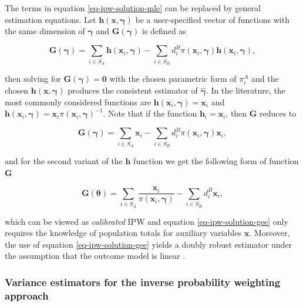 \documentclass[
]{jss}
\begin{document}
The terms in equation \eqref{eq-ipw-solution-mle} can be replaced by
general estimation equations. Let
\(\boldsymbol{h}(\boldsymbol{x}, \boldsymbol{\gamma})\) be a
user-specified vector of functions with the same dimension of
\(\boldsymbol{\gamma}\) and \(\boldsymbol{G}(\boldsymbol{\gamma})\) is
defined as

\begin{equation}
\label{gee}
\boldsymbol{G}(\boldsymbol{\gamma})=\sum_{i \in S_A} \boldsymbol{h}\left(\boldsymbol{x}_i, \boldsymbol{\gamma}\right)-\sum_{i \in S_B} d_i^B \pi\left(\boldsymbol{x}_i, \boldsymbol{\gamma}\right) \boldsymbol{h}\left(\boldsymbol{x}_i, \boldsymbol{\gamma}\right),
\end{equation}

then solving for \(\boldsymbol{G}(\boldsymbol{\gamma})=\boldsymbol{0}\)
with the chosen parametric form of \(\pi_i^A\) and the chosen
\(\boldsymbol{h}(\boldsymbol{x},\boldsymbol{\gamma})\) produces the
consistent estimator of \(\hat{\boldsymbol{\gamma}}\). In the
literature, the most commonly considered functions are
\(\boldsymbol{h}\left(\boldsymbol{x}_i, \boldsymbol{\gamma}\right) = \boldsymbol{x}_i\)
and
\(\boldsymbol{h}\left(\boldsymbol{x}_i, \boldsymbol{\gamma}\right) = \boldsymbol{x}_i \pi\left(\boldsymbol{x}_i, \boldsymbol{\gamma}\right)^{-1}\).
Note that if the function \(\boldsymbol{h}_i=\boldsymbol{x}_i\), then
\(\boldsymbol{G}\) reduces to

\[
\boldsymbol{G}(\boldsymbol{\gamma}) = \sum_{i \in S_A} \boldsymbol{x}_i-\sum_{i \in S_B} d_i^B \pi\left(\boldsymbol{x}_i, \boldsymbol{\gamma}\right) \boldsymbol{x}_i,
\]

and for the second variant of the \(\boldsymbol{h}\) function we get the
following form of function \(\boldsymbol{G}\)

\begin{equation}
\boldsymbol{G}(\boldsymbol{\theta}) = \sum_{i \in S_A} \frac{\boldsymbol{x}_i}{\pi\left(\boldsymbol{x}_i, \boldsymbol{\gamma}\right) }-\sum_{i \in S_B} d_i^B \boldsymbol{x}_i,
\label{eq-ipw-solution-gee}
\end{equation}

which can be viewed as \textit{calibrated} IPW and equation
\eqref{eq-ipw-solution-gee} only requires the knowledge of population
totals for auxiliary variables \(\boldsymbol{x}\). Moreover, the use of
equation \eqref{eq-ipw-solution-gee} yields a doubly robust estimator
under the assumption that the outcome model is linear
\citep{kim_theory_2012}.

\subsubsection{Variance estimators for the inverse probability weighting
approach}\label{variance-estimators-for-the-inverse-probability-weighting-approach}
\end{document}
